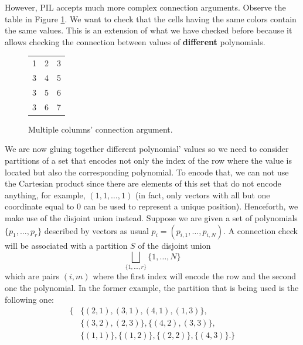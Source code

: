However, PIL accepts much more complex connection arguments. Observe the table in Figure \ref{table:connection-arg-complex-example}. We want to check that the cells having the same colors contain the same values. This is an extension of what we have checked before because it allows checking the connection between values of \textbf{different} polynomials.
\begin{figure}[H]
\centering
\begin{tabular}{|c|c|c|}
\hline
\att	&\btt	&\ctt	\\ \hline
                 1	&2							&\cellcolor{cyan}3 						\\
\cellcolor{cyan} 3	&4							&\cellcolor{pink} 5 	\\
\cellcolor{cyan} 3	&\cellcolor{pink} 5			&\cellcolor{brown} 6 	\\
\cellcolor{cyan} 3	&\cellcolor{brown}6			&7 						\\
\hline
\end{tabular}
\caption{Multiple columns' connection argument. }
\label{table:connection-arg-complex-example}
\end{figure}

We are now gluing together different polynomial' values so we need to consider partitions of a set that encodes not only the index of the row where the value is located but also the corresponding polynomial. To encode that, we can not use the Cartesian product since there are elements of this set that do not encode anything, for example, $(1, 1, \dots, 1)$ (in fact, only vectors with all but one coordinate equal to $0$ can be used to represent a unique position). Henceforth, we make use of the disjoint union instead. Suppose we are given a set of polynomials $\{p_1, \dots, p_r\}$ described by vectors as usual $p_i = (p_{i, 1}, \dots, p_{i, N})$. A connection check will be associated with a partition $S$ of the disjoint union
\[
\bigsqcup_{\{1, \dots, r\}} \{1, \dots, N\}
\] 
which are pairs $(i, m)$ where the first index will encode the row and the second one the polynomial. In the former example, the partition that is being used is the following one:
\begin{align*}
\{ 
&\{(2, 1), (3, 1), (4, 1), (1, 3) \}, \\
&\{ (3, 2), (2, 3) \}, \{ (4, 2), (3, 3)\}, \\
&\{ (1, 1)\} , \{(1, 2)\}, \{(2, 2)\}, \{(4, 3)\}.
\}
\end{align*}

